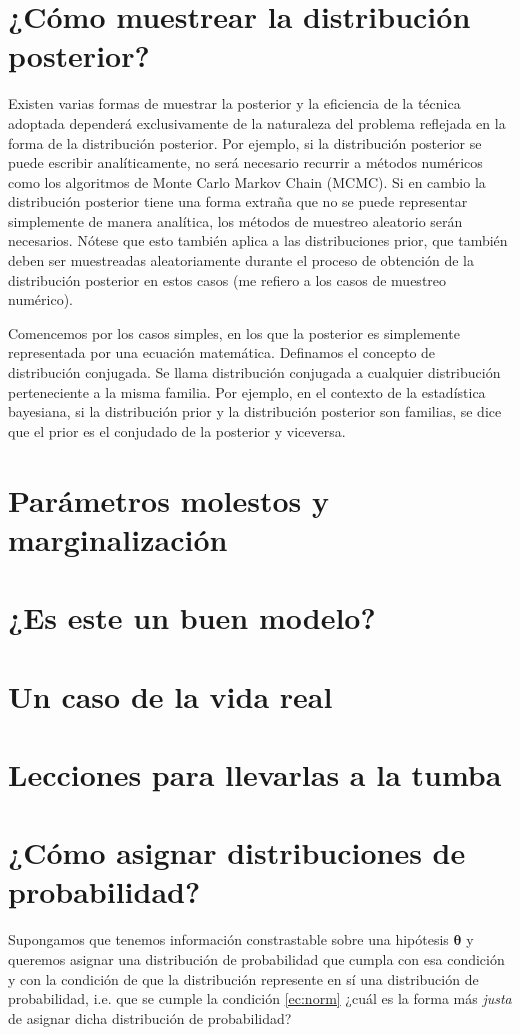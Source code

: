 \documentclass[a4paper,twoside]{article}
\newcommand{\hip}{\ensuremath{\bm{\theta}}\xspace}
\begin{document}
\section{¿Cómo muestrear la distribución posterior?}
%
Existen varias formas de muestrar la posterior y la eficiencia de la técnica adoptada dependerá
exclusivamente de la naturaleza del problema reflejada en la forma de la distribución posterior. Por
ejemplo, si la distribución posterior se puede escribir analíticamente, no será necesario recurrir a
métodos numéricos como los algoritmos de Monte Carlo Markov Chain (MCMC). Si en cambio la
distribución posterior tiene una forma extraña que no se puede representar simplemente de manera
analítica, los métodos de muestreo aleatorio serán necesarios. Nótese que esto también aplica a las
distribuciones prior, que también deben ser muestreadas aleatoriamente durante el proceso de
obtención de la distribución posterior en estos casos (me refiero a los casos de muestreo numérico).

Comencemos por los casos simples, en los que la posterior es simplemente representada por una
ecuación matemática. Definamos el concepto de distribución conjugada. Se llama distribución
conjugada a cualquier distribución perteneciente a la misma familia. Por ejemplo, en el contexto de
la estadística bayesiana, si la distribución prior y la distribución posterior son familias, se dice
que el prior es el conjudado de la posterior y viceversa.

\section{Parámetros molestos y marginalización}

\section{¿Es este un buen modelo?}

\section{Un caso de la vida real}

\section{Lecciones para llevarlas a la tumba}

\appendix

\section{¿Cómo asignar distribuciones de probabilidad?}\label{sec:pdfs}

Supongamos que tenemos información constrastable sobre una hipótesis $\hip$ y queremos asignar una
distribución de probabilidad que cumpla con esa condición y con la condición de que la distribución
represente en sí una distribución de probabilidad, i.e. que se cumple la condición \eqref{ec:norm}
¿cuál es la forma más \emph{justa} de asignar dicha distribución de probabilidad?
\end{document}
